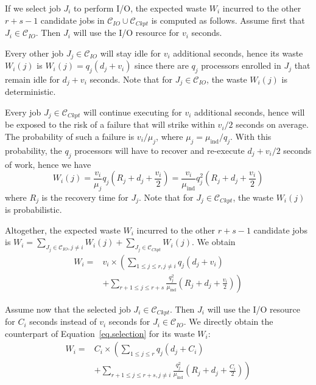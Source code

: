 \documentclass[conference,nofonttune]{IEEEtran}
\newcommand{\muind}{\mu_{\text{ind}}}
\newcommand{\ckpt}[1]{C_{#1}}
\newcommand{\reco}[1]{R_{#1}}
\newcommand{\wap}[1]{W_{#1}}
\newcommand{\wapp}[2]{W_{#1}(#2)}
\newcommand{\Catiocat}{\mathcal{C}_{IO}\xspace}
\newcommand{\Catckptcat}{\mathcal{C}_{Ckpt}\xspace}
\begin{document}
If we select job $J_{i}$ to perform I/O, the expected waste $\wap{i}$
incurred to the other $r+s-1$ candidate jobs in  $\Catiocat \cup
\Catckptcat$ is computed as follows. Assume first that $J_{i} \in \Catiocat$.
Then  $J_{i}$ will use the I/O resource for $v_{i}$ seconds.
\begin{compactitem}
%
  \item Every other job $J_{j} \in \Catiocat$ will stay idle for $v_{i}$
  additional seconds, hence its waste $\wapp{i}{j}$ is $\wapp{i}{j} = q_{j}
  (d_{j} + v_{i})$ since there are $q_{j}$ processors enrolled in $J_{j}$ that
  remain idle for $d_{j} + v_{i}$ seconds. Note that for $J_{j} \in \Catiocat$, the
  waste $\wapp{i}{j}$ is deterministic.
%
  \item Every job $J_{j} \in \Catckptcat$ will continue executing for
  $v_{i}$ additional seconds, hence will be exposed to the risk of a failure
  that will strike within $v_{i}/2$ seconds on average. The probability of such
  a failure is $v_{i}/\mu_{j}$, where $\mu_{j} =
  \muind/q_{j}$. With this
  probability, the $q_{j}$ processors will have to recover and re-execute $d_{j} +
  v_{i}/2$ seconds of work, hence we have $$\wapp{i}{j} =
  \frac{v_{i}}{\mu_{j} } q_{j} (\reco{j} + d_{j} + \frac{v_{i}}{2}) =
  \frac{v_{i}}{\muind} q^{2}_{j} (\reco{j} + d_{j} + \frac{v_{i}}{2})$$ where
  $\reco{j}$ is the recovery time for $J_{j}$. Note that for $J_{j} \in
  \Catckptcat$, the waste $\wapp{i}{j}$ is probabilistic.
%
 \end{compactitem}
 Altogether, the expected waste $\wap{i}$ incurred
to the other $r+s-1$ candidate jobs is
$\wap{i} = \sum_{J_{j} \in \Catiocat, j\neq i} \wapp{i}{j} + \sum_{J_{j} \in \Catckptcat} \wapp{i}{j}$.
We obtain
\begin{equation}
\label{eq.selection}
\begin{array}{ll}
 \wap{i} = & v_{i} \times \left( \sum_{1 \leq j \leq r, j\neq i} q_{j} (d_{j} + v_{i}) \right.\\
& + \left. \sum_{r+1 \leq j \leq r+s}   \frac{q^{2}_{j}}{\muind} (\reco{j} + d_{j} + \frac{v_{i}}{2}) \right)
 \end{array}
\end{equation}

Assume now that the selected job $J_{i} \in \Catckptcat$. Then $J_{i}$
will use the I/O resource for $\ckpt{i}$ seconds instead of $v_{i}$
seconds for $J_{i} \in \Catiocat$. We directly obtain the counterpart
of Equation~\eqref{eq.selection} for its waste $\wap{i}$:
 \begin{equation}
\label{eq.selection2}
 \begin{array}{ll}
 \wap{i} = & \ckpt{i} \times \left( \sum_{1 \leq j \leq r} q_{j} (d_{j} + \ckpt{i}) \right.\\
& + \left. \sum_{r+1 \leq j \leq r+s, j\neq i}   \frac{q^{2}_{j}}{\muind} (\reco{j} + d_{j} + \frac{C_{i}}{2}) \right)
 \end{array}
\end{equation}
\end{document}
